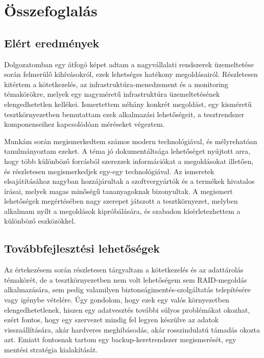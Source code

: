 
\chapter{Összefoglalás}

\section{Elért eredmények}
Dolgozatomban egy átfogó képet adtam a nagyvállalati rendszerek üzemeltetése során felmerülő kihívásokról, ezek lehetséges hatékony megoldásairól. Részletesen kitértem a kötetkezelés, az infrastruktúra-menedzsment és a monitoring témakörökre, melyek egy nagyméretű infrastruktúra üzemeltetésének elengedhetetlen kellékei. Ismertettem néhány konkrét megoldást, egy kisméretű tesztkörnyezetben bemutattam ezek alkalmazási lehetőségeit, a tesztrendszer komponenseihez kapcsolódóan méréseket végeztem.

Munkám során megismerkedtem számos modern technológiával, és mélyrehatóan tanulmányoztam ezeket. A téma jó dokumentáltsága lehetőséget nyújtott arra, hogy több különböző forrásból szerezzek információkat a megoldásokat illetően, és részletesen megismerkedjek egy-egy technológiával. Az ismeretek elsajátításához nagyban hozzájárultak a szoftvergyártók és a termékek hivatalos írásai, melyek magas minőségű tananyagoknak bizonyultak. A megismert lehetőségek megértésében nagy szerepet játszott a tesztkörnyezet, melyben alkalmam nyílt a megoldások kipróbálására, és szabadon kísérletezhettem a különböző eszközökkel.

\section{Továbbfejlesztési lehetőségek}
Az értekezésem során részletesen tárgyaltam a kötetkezelés és az adattárolás témakörét, de a tesztkörnyezetben nem volt lehetőségem sem RAID-megoldás alkalmazására, sem pedig valamilyen biztonságimentés-szolgáltatás telepítésére vagy igénybe vételére. Úgy gondolom, hogy ezek egy valós környezetben elengedhetetlenek, hiszen egy adatvesztés további súlyos problémákat okozhat, ezért fontos, hogy egy szervezet mindig fel legyen készülve az adatok visszaállítására, akár hardveres meghibásodás, akár rosszindulatú támadás okozta azt. Emiatt fontosnak tartom egy backup-keretrendszer megismerését, egy mentési stratégia kialakítását.

